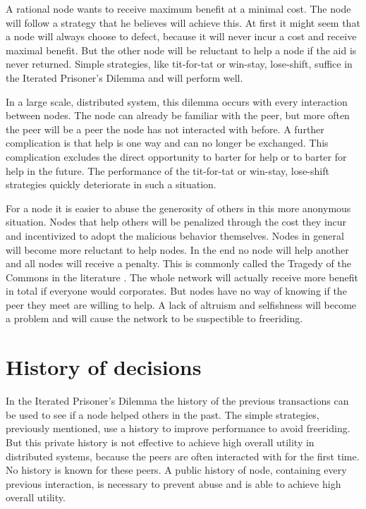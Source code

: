 A rational node wants to receive maximum benefit at a minimal cost.
The node will follow a strategy that he believes will achieve this.
At first it might seem that a node will always choose to defect,
because it will never incur a cost and receive maximal benefit.
But the other node will be reluctant to help a node if the aid is never returned.
Simple strategies, like tit-for-tat or win-stay, lose-shift, suffice in the Iterated Prisoner's Dilemma
and will perform well\cite{Nowak-Cooperation}.

In a large scale, distributed system, this dilemma occurs with every interaction between nodes.
The node can already be familiar with the peer,
but more often the peer will be a peer the node has not interacted with before.
A further complication is that help is one way and can no longer be exchanged.
This complication excludes the direct opportunity to barter for help 
or to barter for help in the future\cite{Lai-Incentives}.
The performance of the tit-for-tat or win-stay, lose-shift strategies
quickly deteriorate in such a situation.

For a node it is easier to abuse the generosity of others in this more anonymous situation.
Nodes that help others will be penalized through the cost they incur
and incentivized to adopt the malicious behavior themselves.
Nodes in general will become more reluctant to help nodes\cite{Nowak-PrisonerDilemma}.
In the end no node will help another and all nodes will receive a penalty.
This is commonly called the Tragedy of the Commons in the literature \cite{hardin-tragedy}.
The whole network will actually receive more benefit in total if everyone would corporates.
But nodes have no way of knowing if the peer they meet are willing to help.
A lack of altruism and selfishness will become a problem 
and will cause the network to be suspectible to freeriding.

\section{History of decisions}

In the Iterated Prisoner's Dilemma the history of the previous transactions can be used 
to see if a node helped others in the past.
The simple strategies, previously mentioned, use a history to improve performance
to avoid freeriding.
But this private history is not effective to achieve high overall utility in distributed systems,
because the peers are often interacted with for the first time.
No history is known for these peers.
A public history of node, containing every previous interaction, is necessary to prevent abuse
and is able to achieve high overall utility\cite{Lai-Incentives}.

